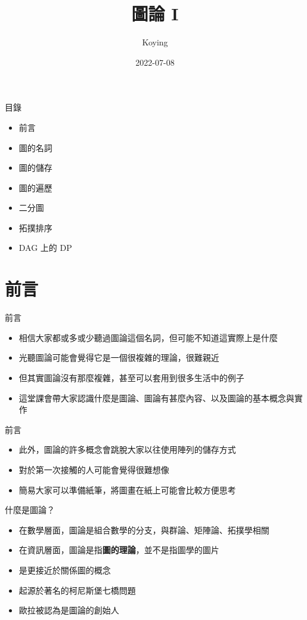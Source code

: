 \documentclass[aspectratio=169]{beamer}
\title{圖論 I}
\author{Koying}
\date{2022-07-08}
\begin{document}
    \begin{frame}
        \titlepage
    \end{frame}

    \begin{frame}{目錄}
        \begin{itemize}
            \item 前言
            \item 圖的名詞
            \item 圖的儲存
            \item 圖的遍歷
            \item 二分圖
            \item 拓撲排序
            \item DAG 上的 DP
        \end{itemize}
    \end{frame}

    \section{前言}

    \begin{frame}{前言}
        \begin{itemize}
            \item 相信大家都或多或少聽過圖論這個名詞，但可能不知道這實際上是什麼
            \item 光聽圖論可能會覺得它是一個很複雜的理論，很難親近
            \item 但其實圖論沒有那麼複雜，甚至可以套用到很多生活中的例子
            \item 這堂課會帶大家認識什麼是圖論、圖論有甚麼內容、以及圖論的基本概念與實作
        \end{itemize}
    \end{frame}

    \begin{frame}{前言}
        \begin{itemize}
            \item 此外，圖論的許多概念會跳脫大家以往使用陣列的儲存方式
            \item 對於第一次接觸的人可能會覺得很難想像
            \item 簡易大家可以準備紙筆，將圖畫在紙上可能會比較方便思考
        \end{itemize}
    \end{frame}


    \begin{frame}{什麼是圖論？}
        \begin{itemize}
            \item<1-> 在數學層面，圖論是組合數學的分支，與群論、矩陣論、拓撲學相關
            \item<2-> 在資訊層面，圖論是指\textbf{圖的理論}，並不是指圖學的圖片
            \item<3-> 是更接近於關係圖的概念
            \item<4-> 起源於著名的柯尼斯堡七橋問題
            \item<5-> 歐拉被認為是圖論的創始人
        \end{itemize}
    \end{frame}
\end{document}
